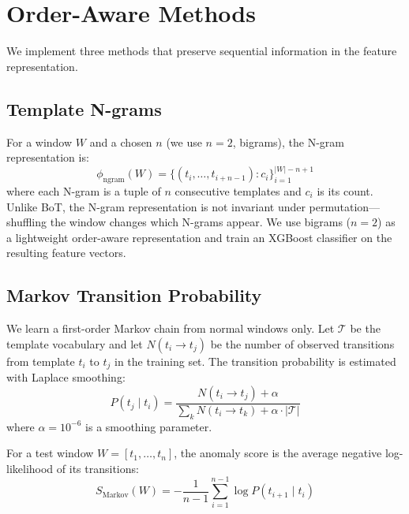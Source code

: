 \documentclass[11pt]{article}
\begin{document}
\section{Order-Aware Methods}
\label{sec:methods}

We implement three methods that preserve sequential information in the feature representation.

\subsection{Template N-grams}

For a window $W$ and a chosen $n$ (we use $n=2$, bigrams), the N-gram representation is:
\begin{equation}
    \phi_{\text{ngram}}(W) = \big\{ (t_i, \dots, t_{i+n-1}) : c_i \big\}_{i=1}^{|W|-n+1}
    \label{eq:ngram}
\end{equation}
where each N-gram is a tuple of $n$ consecutive templates and $c_i$ is its count.
Unlike BoT, the N-gram representation is not invariant under permutation---shuffling the window changes which N-grams appear.
We use bigrams ($n=2$) as a lightweight order-aware representation and train an XGBoost classifier on the resulting feature vectors.

\subsection{Markov Transition Probability}

We learn a first-order Markov chain from normal windows only.
Let $\mathcal{T}$ be the template vocabulary and let $N(t_i \rightarrow t_j)$ be the number of observed transitions from template $t_i$ to $t_j$ in the training set.
The transition probability is estimated with Laplace smoothing:
\begin{equation}
    P(t_j \mid t_i) = \frac{N(t_i \rightarrow t_j) + \alpha}{\sum_{k} N(t_i \rightarrow t_k) + \alpha \cdot |\mathcal{T}|}
    \label{eq:markov_prob}
\end{equation}
where $\alpha = 10^{-6}$ is a smoothing parameter.

For a test window $W = [t_1, \dots, t_n]$, the anomaly score is the average negative log-likelihood of its transitions:
\begin{equation}
    S_{\text{Markov}}(W) = -\frac{1}{n-1} \sum_{i=1}^{n-1} \log P(t_{i+1} \mid t_i)
    \label{eq:markov_score}
\end{equation}
\end{document}
